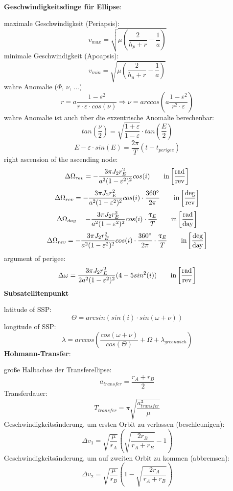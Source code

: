 \documentclass[a4paper,10pt]{article}
\newcommand{\f}{\textbf}
\begin{document}
\noindent \f{Geschwindigkeitsdinge für Ellipse}:\\
\vspace*{3pt}

\noindent maximale Geschwindigkeit (Periapsis):
\[v_{max} = \sqrt{\mu\left(\frac{2}{h_p+r} -\frac{1}{a}\right)}\]
minimale Geschwindigkeit (Apoapsis):
\[v_{min} = \sqrt{\mu\left(\frac{2}{h_a+r} -\frac{1}{a}\right)}\]
wahre Anomalie ($\Phi$, $\nu$, ...)
\[r = a\frac{1-\varepsilon^2}{r\cdot \varepsilon \cdot cos(\nu)} \Rightarrow \nu = arccos\left(a\frac{1-\varepsilon^2}{r^2\cdot \varepsilon}\right)\]
wahre Anomalie ist auch über die exzentrische Anomalie berechenbar:
\[tan\left(\frac{\nu}{2}\right) = \sqrt{\frac{1+\varepsilon}{1-\varepsilon}}\cdot tan\left(\frac{E}{2}\right)\]
\[E - \varepsilon \cdot sin(E) = \frac{2\pi}{T}(t-t_{perigee})\]
right ascension of the ascending node:
\[\Delta \Omega_{rev} = -\frac{3\pi J_2r_E^2}{a^2(1-\varepsilon^2)^2}cos(i) \text{\qquad  in} \left[\frac{\text{rad}}{\text{rev}}\right]\]
\[\Delta \Omega_{rev} = -\frac{3\pi J_2r_E^2}{a^2(1-\varepsilon^2)^2}cos(i) \cdot \frac{360^{\circ}}{2\pi} \text{\qquad  in} \left[\frac{\text{deg}}{\text{rev}}\right]\]
\[\Delta \Omega_{day} = -\frac{3\pi J_2r_E^2}{a^2(1-\varepsilon^2)^2}cos(i) \cdot \frac{\uptau_E}{T} \text{\qquad  in} \left[\frac{\text{rad}}{\text{day}}\right]\]
\[\Delta \Omega_{rev} = -\frac{3\pi J_2r_E^2}{a^2(1-\varepsilon^2)^2}cos(i) \cdot \frac{360^{\circ}}{2\pi}\cdot \frac{\uptau_E}{T} \text{\qquad  in} \left[\frac{\text{deg}}{\text{day}}\right]\]
argument of perigee:
\[\Delta \omega = \frac{3\pi J_2r_E^2}{2a^2(1-\varepsilon^2)^2}(4-5sin^2(i))\text{\qquad  in} \left[\frac{\text{rad}}{\text{rev}}\right]\]
\f{Subsatellitenpunkt}\\
\vspace*{5pt}

\noindent latitude of SSP: 
\[\Theta = arcsin(sin(i)\cdot sin(\omega + \nu))\]
longitude of SSP: 
\[\lambda = arccos\left(\frac{cos(\omega + \nu)}{cos(\Theta)} + \Omega + \lambda_{greenwich}\right)\]
\f{Hohmann-Transfer}:\\
\vspace*{5pt}

\noindent große Halbachse der Transferellipse:
\[a_{transfer} = \frac{r_A + r_B}{2}\]
Transferdauer: 
\[T_{transfer} = \pi \sqrt{\frac{a_{transfer}^3}{\mu}}\]
Geschwindigkeitsänderung, um ersten Orbit zu verlassen (beschleunigen): 
\[\Delta v_1 = \sqrt{\frac{\mu}{r_A}}\left(\sqrt{\frac{2r_B}{r_A + r_B}} -1 \right)\]
Geschwindigkeitsänderung, um auf zweiten Orbit zu kommen (abbremsen): 
\[\Delta v_2 = \sqrt{\frac{\mu}{r_B}}\left(1-\sqrt{\frac{2r_A}{r_A + r_B}} \right)\]
\vspace*{5pt}
\end{document}
